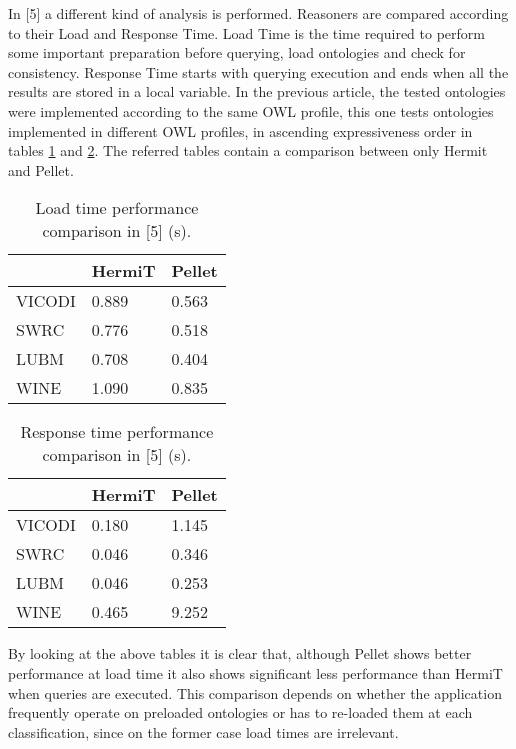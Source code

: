 In [5] a different kind of analysis is performed. Reasoners are compared according to their Load and Response Time.
Load Time is the time required to perform some important preparation before querying, load ontologies and check for consistency. Response Time starts with querying execution and ends when all the results are stored in a local variable. 
In the previous article, the tested ontologies were implemented according to the same OWL profile, this one tests ontologies implemented in different OWL profiles, in ascending expressiveness order in tables \ref{tab:3} and \ref{tab:4}.
The referred tables contain a comparison between only Hermit and Pellet.

\begin{table}[]
\centering
\begin{tabular}{|l|l|l|}
\hline
          &   HermiT  &  Pellet \\ \hline
VICODI    &    0.889  &  0.563   \\ \hline
SWRC      &    0.776  &  0.518  \\ \hline
LUBM      &    0.708  &  0.404   \\ \hline
WINE      &    1.090  &  0.835   \\ \hline
\end{tabular}
\caption{Load time performance comparison in [5] (s).}
\label{tab:3}
\end{table}

\begin{table}[]
\centering
\begin{tabular}{|l|l|l|}
\hline
          &  HermiT  &  Pellet  \\ \hline
VICODI    &    0.180  &  1.145  \\ \hline
SWRC      &    0.046  &  0.346  \\ \hline
LUBM      &    0.046  &  0.253  \\ \hline
WINE      &    0.465  &  9.252  \\ \hline
\end{tabular}
  \caption{Response time performance comparison in [5] (s).}
\label{tab:4}
\end{table}

By looking at the above tables it is clear that, although Pellet shows better performance at load time it also shows significant less performance than HermiT when queries are executed. This comparison depends on whether the application frequently operate on preloaded ontologies or has to re-loaded them at each classification, since on the former case load times are irrelevant. 


